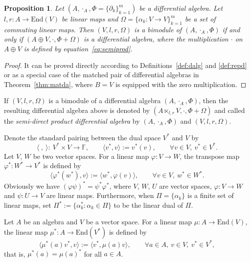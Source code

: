 \documentclass[10pt,a4paper]{amsart}
\numberwithin{equation}{section}
\newtheorem{Proposition}[Theorem]{Proposition}
{ \theoremstyle{definition}
	\newtheorem{Definition}[Theorem]{Definition}
	\newtheorem{Note}[Theorem]{Note}
	\newtheorem{Example}[Theorem]{Example}
	\newtheorem{Remark}[Theorem]{Remark} }
\newcommand{\End}{\mathrm{End}}
\begin{document}
\begin{Proposition}\label{pro:semidirect}
 Let $(A, \cdot_A, \Phi = \{\partial_k\}_{k=1}^m)$ be a differential algebra.
 Let $l, r\colon A \to \End (V)$ be linear maps
 and $\Omega = \{\alpha_k\colon V \to V\}_{k=1}^m$ be a set of commuting linear maps.
 Then $(V, l, r, \Omega)$ is a bimodule of $(A, \cdot_A, \Phi)$ if and only if $(A \oplus V, \cdot, \Phi + \Omega)$ is a differential algebra, where the multiplication $\cdot$ on $A \oplus V$ is defined by equation~\eqref{eq:semiprod}.
\end{Proposition}
\begin{proof}
 It can be proved directly according to Definitions~\ref{def:dalg} and \ref{def:repd} or as a special case of the matched pair of differential algebras in Theorem~\ref{thm:matda}, where $B = V$ is equipped with the zero multiplication.
\end{proof}

If $(V, l, r, \Omega)$ is a bimodule of a differential algebra $(A, \cdot_A, \Phi)$, then the resulting differential algebra above is denoted by $(A \ltimes_{l,r} V, \cdot, \Phi + \Omega)$ and called the \textit{semi-direct product differential algebra} by $(A, \cdot_A, \Phi)$ and $(V, l, r, \Omega)$.

Denote the standard pairing between the dual space $V^*$ and $V$ by
\begin{equation*}
 \langle\ ,\ \rangle\colon \ V^* \times V \to \mathbb{F}, \qquad
 \langle v^*, v \rangle :=v^*(v), \qquad
 \forall v \in V,\ v^* \in V^*.
\end{equation*}
Let $V$, $W$ be two vector spaces.
For a linear map $\varphi\colon V \to W$,
the transpose map $\varphi^*\colon W^* \to V^*$ is defined by
\begin{equation*}
 \langle \varphi^*(w^*), v \rangle := \langle w^*, \varphi(v) \rangle, \qquad
 \forall v \in V, \ w^* \in W^*.
\end{equation*}
Obviously we have $(\varphi\psi)^*=\psi^*\varphi^*$, where $V$, $W$, $U$ are vector spaces, $\varphi\colon V \to W$ and $\psi\colon U \to V$ are linear maps.
Furthermore, when $\Pi = \{\alpha_k\}$ is a finite set of linear maps,
set $\Pi^* := \{\alpha_k^*\colon \alpha_k \in \Pi\}$ to be the linear dual of $\Pi$.

Let $A$ be an algebra and $V$ be a vector space.
For a linear map $\mu\colon A \to \End (V)$, the linear map $\mu^*\colon A \to \End(V^*)$ is defined by
\begin{equation*}
 \langle \mu^*(a)v^*, v \rangle := \langle v^*, \mu(a)v \rangle, \qquad
 \forall a \in A,\ v \in V, \ v^* \in V^*,
\end{equation*}
that is, $\mu^*(a) = \mu(a)^*$ for all $a \in A$.
\end{document}
